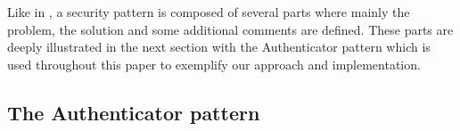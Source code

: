 Like in \cite{fernandez2018abstract}, a security pattern is composed of several parts where mainly the problem, the solution and some additional comments are defined. These parts are deeply illustrated in the next section with the Authenticator pattern which is used throughout this paper to exemplify our approach and implementation.

\subsection{The Authenticator pattern}

